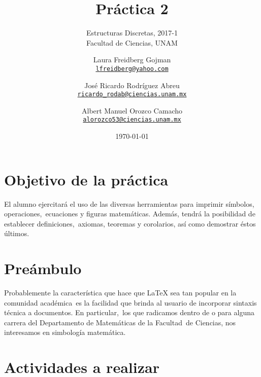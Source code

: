 \documentclass[paper=letter, fontsize=12pt]{scrartcl}
\title{Práctica 2}
\subtitle{
  Estructuras Discretas, 2017-1\\
  Facultad de Ciencias, UNAM
}
\author{
  \normalsize
  Laura Freidberg Gojman\\
  \normalsize
  \texttt{\href{mailto:lfreidberg@yahoo.com}{lfreidberg@yahoo.com}}
  \and
  \normalsize
  José Ricardo Rodríguez Abreu\\
  \normalsize
  \texttt{\href{mailto:ricardo_rodab@ciencias.unam.mx}{ricardo\_rodab@ciencias.unam.mx}}
  \and
  \normalsize
  Albert Manuel Orozco Camacho\\
  \normalsize
  \texttt{\href{mailto:alorozco53@ciencias.unam.mx}{alorozco53@ciencias.unam.mx}}
}
\date{\today}
\begin{document}
\maketitle

\section*{Objetivo de la práctica}

\noindent
El alumno ejercitará el uso de las diversas herramientas para imprimir símbolos, operaciones,\
ecuaciones y figuras matemáticas. Además, tendrá la posibilidad de establecer definiciones,\
axiomas, teoremas y corolarios, así como demostrar éstos últimos.

\section*{Preámbulo}

\noindent
Probablemente la característica que hace que \LaTeX{} sea tan popular en la comunidad académica\
es la facilidad que brinda al usuario de incorporar sintaxis técnica a documentos. En particular,\
los que radicamos dentro de o para alguna carrera del Departamento de Matemáticas de la Facultad\
de Ciencias, nos interesamos en simbología matemática.

\section*{Actividades a realizar}
\end{document}
